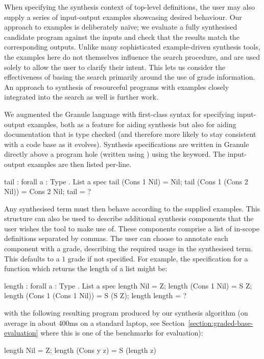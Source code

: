 \label{sec:examples}

When specifying the synthesis context of top-level definitions, the user may
also supply a series of input-output examples showcasing desired behaviour. Our
approach to examples is deliberately na\"{i}ve; we evaluate a fully synthesised
candidate program against the inputs and check that the results match the
corresponding outputs. Unlike many sophisticated example-driven synthesis tools,
the examples here do not themselves influence the search procedure, and are used
solely to allow the user to clarify their intent. This lets us consider the
effectiveness of basing the search primarily around the use of grade
information. An approach to synthesis of resourceful programs with examples
closely integrated into the search as well is further work.

We augmented the Granule language with first-class syntax for specifying
input-output examples, both as a feature for aiding synthesis but also for
aiding documentation that is type checked (and therefore more likely to stay
consistent with a code base as it evolves). Synthesis specifications are written
in Granule directly above a program hole (written using ) using the
 keyword. The input-output examples are then listed per-line.
\begin{granule}
tail : forall { a : Type } . List a %
spec
  tail (Cons 1 Nil) = Nil;
  tail (Cons 1 (Cons 2 Nil)) = Cons 2 Nil;
tail = ?
\end{granule}
Any synthesised term must then behave according to the supplied examples. This
 structure can also be used to describe additional synthesis
components that the user wishes the tool to make use of. These components
comprise a list of in-scope definitions separated by commas. The user can choose
to annotate each component with a grade, describing the required usage in the
synthesised term. This defaults to a $1$ grade if not specified. For example,
the specification for a function which returns the length of a list might be:
\begin{granule}
length : forall { a : Type } . List a %
spec
    length Nil = Z;
    length (Cons 1 Nil) = S Z;
    length (Cons 1 (Cons 1 Nil)) = S (S Z);
    length %
length = ?
\end{granule}
with the following resulting program produced by our synthesis algorithm (on average
in about 400ms on a standard laptop, see Section~\ref{section:graded-base-evaluation} where this is one of the benchmarks for evaluation):
\begin{granule}
length Nil = Z;
length (Cons y z) = S (length z)
\end{granule}

